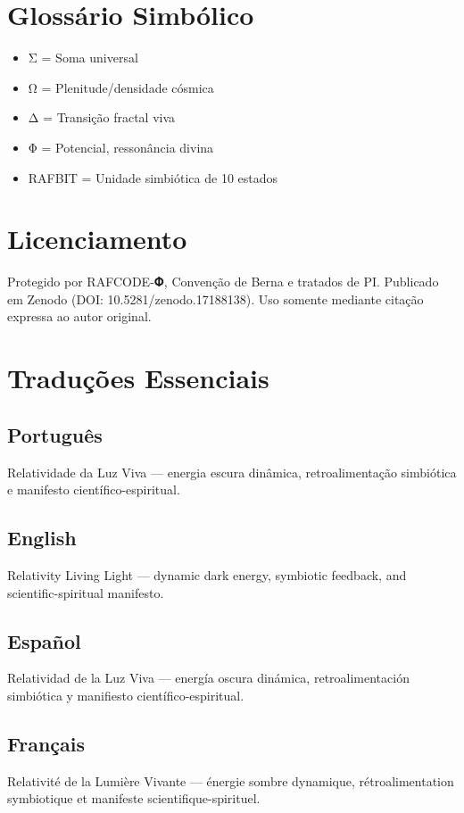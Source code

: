 \documentclass[11pt]{article}
\begin{document}
\section{Glossário Simbólico}
\begin{itemize}
\item Σ = Soma universal  
\item Ω = Plenitude/densidade cósmica  
\item Δ = Transição fractal viva  
\item Φ = Potencial, ressonância divina  
\item RAFBIT = Unidade simbiótica de 10 estados  
\end{itemize}

\section{Licenciamento}
Protegido por RAFCODE-𝚽, Convenção de Berna e tratados de PI.  
Publicado em Zenodo (DOI: 10.5281/zenodo.17188138).  
Uso somente mediante citação expressa ao autor original.  

\section{Traduções Essenciais}
\subsection*{Português}
Relatividade da Luz Viva — energia escura dinâmica, retroalimentação simbiótica e manifesto científico-espiritual.

\subsection*{English}
Relativity Living Light — dynamic dark energy, symbiotic feedback, and scientific-spiritual manifesto.

\subsection*{Español}
Relatividad de la Luz Viva — energía oscura dinámica, retroalimentación simbiótica y manifiesto científico-espiritual.

\subsection*{Français}
Relativité de la Lumière Vivante — énergie sombre dynamique, rétroalimentation symbiotique et manifeste scientifique-spirituel.
\end{document}
